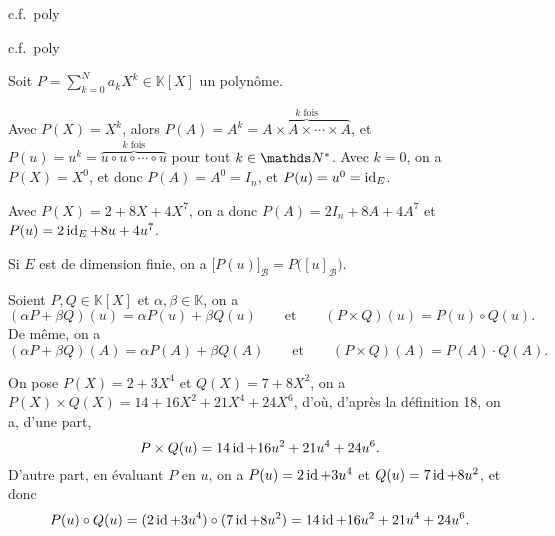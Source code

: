 \begin{met}
	c.f.\ poly
\end{met}

\begin{exo}
	c.f.\ poly
\end{exo}

\begin{defn}
	Soit $P = \sum_{k=0}^{N} a_k X^k \in \mathds{K}[X]$\/ un polynôme.

	Avec $P(X) = X^k$, alors $P(A) = A^k = \overbrace{A \times A \times \cdots \times A}^{k \text{ fois}}$, et $P(u) = u^k = \overbrace{u  \circ u  \circ\cdots  \circ u}^{k \text{ fois}}$\/ pour tout $k \in \N^*$. Avec $k = 0$, on a $P(X) = X^0$, et donc $P(A) = A^0 = I_n$, et $P(u) = u^0 = \operatorname{id}_E$.

	Avec $P(X) = 2 + 8X + 4X^7$, on a donc $P(A) = 2I_n + 8A + 4A^7$\/ et $P(u) = 2\operatorname{id}_E + 8u + 4u^7$.
\end{defn}

Si $E$\/ est de dimension finie, on a $\big[P(u)\big]_\mathscr{B} = P\big([u]_\mathscr{B}\big)$.


\begin{prop}
	Soient $P,Q \in \mathds{K}[X]$\/ et $\alpha,\beta \in \mathds{K}$, on a \[
		(\alpha P + \beta Q)(u) = \alpha P(u) + \beta Q(u)\qquad\text{et}\qquad(P\times Q)(u) = P(u) \circ Q(u)
	.\]
	De même, on a \[
		(\alpha P + \beta Q)(A) = \alpha P(A) + \beta Q(A)\qquad\text{et}\qquad(P\times Q)(A) = P(A) \cdot Q(A)
	.\]
\end{prop}

\begin{exmn}
	On pose $P(X) = 2 + 3X^4$\/ et $Q(X) = 7 + 8X^2$, on a $P(X) \times Q(X) = 14 + 16X^2 + 21X^4 + 24X^6$, d'où, d'après la définition 18, on a, d'une part, \[
		P \times Q(u) = 14\operatorname{id} + 16u^2 + 21u^4 + 24u^6
	.\]
	D'autre part, en évaluant $P$\/ en $u$, on a $P(u) = 2\operatorname{id} + 3u^4$\/ et $Q(u) = 7\operatorname{id} + 8u^2$, et donc \[
		P(u)  \circ Q(u) = (2\operatorname{id} + 3u^4)  \circ (7\operatorname{id} + 8u^2) = 14\operatorname{id} + 16u^2 + 21u^4 + 24u^6
	.\]
\end{exmn}

